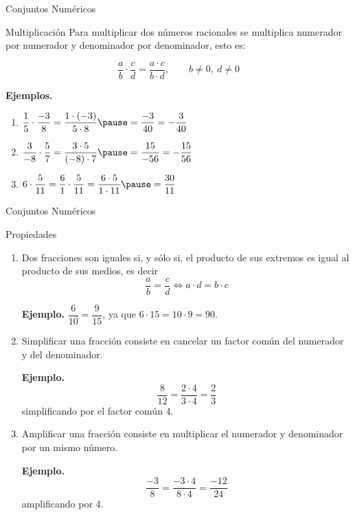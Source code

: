 \documentclass[handout,10pt]{beamer}
\begin{document}
	\begin{frame}{Conjuntos Numéricos}
		\begin{block}{Multiplicación}
			Para multiplicar dos números racionales se multiplica numerador por numerador y denominador por denominador, esto es:
			\pause
			
			\[
			\frac{a}{b}\cdot\frac{c}{d}=\frac{a\cdot c}{b\cdot d},
			\qquad b\neq0,\ d\neq0
			\]
			\pause
			
			\textbf{Ejemplos.}
			\begin{enumerate}
				\item $\dfrac{1}{5}\cdot\dfrac{-3}{8}
				=
				\dfrac{1\cdot(-3)}{5\cdot8}
				\pause
				=
				\dfrac{-3}{40}
				=
				-\dfrac{3}{40}$
				\pause
				
				\item $\dfrac{3}{-8}\cdot\dfrac{5}{7}
				=
				\dfrac{3\cdot5}{(-8)\cdot7}
				\pause
				=
				\dfrac{15}{-56}
				=
				-\dfrac{15}{56}$
				\pause
				
				\item $6\cdot\dfrac{5}{11}
				=
				\dfrac{6}{1}\cdot\dfrac{5}{11}
				=
				\dfrac{6\cdot5}{1\cdot11}
				\pause
				=
				\dfrac{30}{11}$
			\end{enumerate}
		\end{block}
	\end{frame}
	
	\begin{frame}{Conjuntos Numéricos}
		\begin{block}{Propiedades}
			\begin{enumerate}
				\item Dos fracciones son iguales si, y sólo si, el producto de sus extremos es igual al producto de sus medios, es decir
				\[
				\frac{a}{b}=\frac{c}{d}\Longleftrightarrow a\cdot d=b\cdot c
				\]
				
				\textbf{Ejemplo.} $\dfrac{6}{10}=\dfrac{9}{15}$, ya que $6\cdot15=10\cdot9=90$.
				
				\item Simplificar una fracción consiste en cancelar un factor común del numerador y del denominador.
				
				\textbf{Ejemplo.}
				\[
				\dfrac{8}{12}=\dfrac{2\cdot4}{3\cdot4}=\dfrac{2}{3}
				\]
				simplificando por el factor común 4.
				
				\item Amplificar una fracción consiste en multiplicar el numerador y denominador por un mismo número.
				
				\textbf{Ejemplo.}
				\[
				\dfrac{-3}{8}=\dfrac{-3\cdot4}{8\cdot4}=\dfrac{-12}{24}
				\]
				amplificando por 4.
			\end{enumerate}
		\end{block}
	\end{frame}
	
\end{document}
